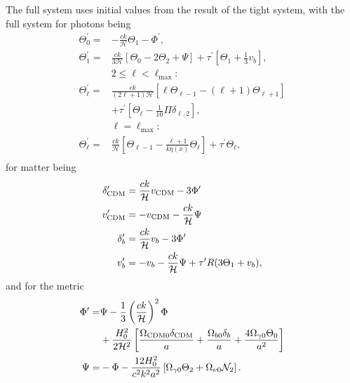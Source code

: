 \documentclass[aps,prl,twocolumn,groupedaddress,nofootinbib]{revtex4-2}
\begin{document}
The full system uses initial values from the result of the tight system, with the full system for photons being
\begin{align*}
    \Theta^\prime_0       =
     & -\frac{ck}{\mathcal{H}} \Theta_1 - \Phi^\prime,                                                                      \\
    \Theta^\prime_1      =
     & \frac{ck}{3\mathcal{H}}\left[\Theta_0 - 2\Theta_2 + \Psi\right] + \tau^\prime\left[\Theta_1 + \frac{1}{3}v_b\right], \\
     & 2 \leq \ell < \ell_{\textrm{max}}:                                                                                   \\
    \Theta^\prime_\ell   =
     & \frac{ck}{(2\ell+1)\mathcal{H}}\left[\ell\Theta_{\ell-1} - (\ell+1)\Theta_{\ell+1}\right]                            \\
     & + \tau^\prime\left[\Theta_\ell - \frac{1}{10}\Pi
    \delta_{\ell,2}\right],                                                                                                 \\
     & \ell = \ell_{\textrm{max}}:                                                                                          \\
    \Theta_{\ell}^\prime =
     & \frac{ck}{\mathcal{H}}\left[
        \Theta_{\ell-1}-\frac{\ell+1}{k\eta(x)}\Theta_\ell\right]+\tau^\prime\Theta_\ell,
    \\
\end{align*}
for matter being
\begin{align*}
    \delta_{\rm CDM}^\prime & = \frac{ck}{\mathcal{H}} v_{\rm CDM} - 3\Phi^\prime                   \\
    v_{\rm CDM}^\prime      & = -v_{\rm CDM} -\frac{ck}{\mathcal{H}} \Psi                           \\
    \delta_b^\prime         & = \frac{ck}{\mathcal{H}}v_b -3\Phi^\prime                             \\
    v_b^\prime              & = -v_b - \frac{ck}{\mathcal{H}}\Psi + \tau^\prime R(3\Theta_1 + v_b), \\
\end{align*}
and for the metric
\begin{align*}
    \Phi^\prime =  & \Psi - \frac{1}{3}\left(\frac{ck}{\mathcal{H}}\right)^2 \Phi                                                                                                                                                         \\
                   & + \frac{H_0^2}{2\mathcal{H}^2}                                                \left[\frac{\Omega_{\rm CDM 0}\delta_{\rm CDM}}{a}  + \frac{\Omega_{b 0}\delta_b}{a} + \frac{4\Omega_{\gamma 0}\Theta_0}{a^{2}}\right] \\
    \Psi         = & -\Phi - \frac{12H_0^2}{c^2k^2a^2}\left[\Omega_{\gamma 0}\Theta_2 + \Omega_{\nu 0}\mathcal{N}_2\right].                                                                                                               \\
\end{align*}
\end{document}
